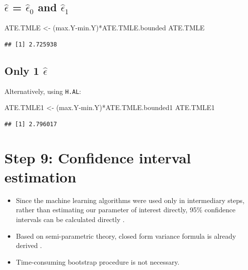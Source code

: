 \documentclass[
]{book}
\newenvironment{Shaded}{\begin{snugshade}}{\end{snugshade}}
\newcommand{\NormalTok}[1]{#1}
\newcommand{\OtherTok}[1]{\textcolor[rgb]{0.56,0.35,0.01}{#1}}
\newcommand{\SpecialCharTok}[1]{\textcolor[rgb]{0.00,0.00,0.00}{#1}}
\providecommand{\tightlist}{%
  \setlength{\itemsep}{0pt}\setlength{\parskip}{0pt}}
\begin{document}
\hypertarget{hatepsilon-hatepsilon_0-and-hatepsilon_1-3}{%
\subsection{\texorpdfstring{\(\hat\epsilon\) = \(\hat\epsilon_0\) and \(\hat\epsilon_1\)}{\textbackslash hat\textbackslash epsilon = \textbackslash hat\textbackslash epsilon\_0 and \textbackslash hat\textbackslash epsilon\_1}}\label{hatepsilon-hatepsilon_0-and-hatepsilon_1-3}}

\begin{Shaded}
\begin{Highlighting}[]
\NormalTok{ATE.TMLE }\OtherTok{\textless{}{-}}\NormalTok{ (max.Y}\SpecialCharTok{{-}}\NormalTok{min.Y)}\SpecialCharTok{*}\NormalTok{ATE.TMLE.bounded   }
\NormalTok{ATE.TMLE }
\end{Highlighting}
\end{Shaded}

\begin{verbatim}
## [1] 2.725938
\end{verbatim}

\hypertarget{only-1-hatepsilon-3}{%
\subsection{\texorpdfstring{Only 1 \(\hat\epsilon\)}{Only 1 \textbackslash hat\textbackslash epsilon}}\label{only-1-hatepsilon-3}}

Alternatively, using \texttt{H.AL}:

\begin{Shaded}
\begin{Highlighting}[]
\NormalTok{ATE.TMLE1 }\OtherTok{\textless{}{-}}\NormalTok{ (max.Y}\SpecialCharTok{{-}}\NormalTok{min.Y)}\SpecialCharTok{*}\NormalTok{ATE.TMLE.bounded1}
\NormalTok{ATE.TMLE1 }
\end{Highlighting}
\end{Shaded}

\begin{verbatim}
## [1] 2.796017
\end{verbatim}

\hypertarget{step-9-confidence-interval-estimation}{%
\section{Step 9: Confidence interval estimation}\label{step-9-confidence-interval-estimation}}

\begin{itemize}
\tightlist
\item
  Since the machine learning algorithms were used only in intermediary steps, rather than estimating our parameter of interest directly, 95\% confidence intervals can be calculated directly \citep{luque2018targeted}.
\item
  Based on semi-parametric theory, closed form variance formula is already derived \citep{van2012targeted}.
\item
  Time-consuming bootstrap procedure is not necessary.
\end{itemize}
\end{document}

